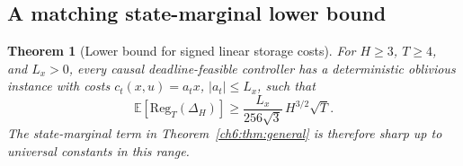 \documentclass[11pt]{article}
\newcommand{\E}{\mathbb{E}}
\newcommand{\Reg}{\mathrm{Reg}}
\theoremstyle{plain}
\newtheorem{Thm:Theorem}{Theorem}[section]
\theoremstyle{remark}
\numberwithin{equation}{section}
\begin{document}
\subsection{A matching state-marginal lower bound}
\begin{Thm:Theorem}[Lower bound for signed linear storage costs]\label{ch6:thm:lower-state}
For $H\ge3$, $T\ge4$, and $L_x>0$, every causal deadline-feasible controller
has a deterministic oblivious instance with costs $c_t(x,u)=a_tx$,
$|a_t|\le L_x$, such that
\begin{equation}\label{ch6:eq:lower-state}
 \boxed{\E[\Reg_T(\Delta_H)]\ge
 \frac{L_x}{256\sqrt3}\,H^{3/2}\sqrt T.}
\end{equation}
The state-marginal term in Theorem~\ref{ch6:thm:general} is therefore sharp up
to universal constants in this range.
\end{Thm:Theorem}
\end{document}

